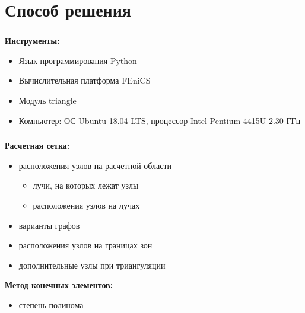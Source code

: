 \section{Способ решения}

\begin{frame}
\frametitle{\insertsection}

\textbf{Инструменты:}
\begin{itemize}
    \item Язык программирования Python
    \item Вычислительная платформа FEniCS
    \item Модуль triangle
    \item Компьютер: ОС Ubuntu 18.04 LTS, процессор Intel Pentium 4415U 2.30 ГГц
\end{itemize}
\end{frame}


\begin{frame}
\frametitle{\insertsection}

\textbf{Расчетная сетка:}
\begin{itemize}
\item расположения узлов на расчетной области
\begin{itemize}
  \item лучи, на которых лежат узлы
  \item расположения узлов на лучах
\end{itemize}
\item варианты графов
\item расположения узлов на границах зон
\item дополнительные узлы при триангуляции
\end{itemize}
\bigskip

\textbf{Метод конечных элементов:}
\begin{itemize}
    \item степень полинома
\end{itemize}
\end{frame}

